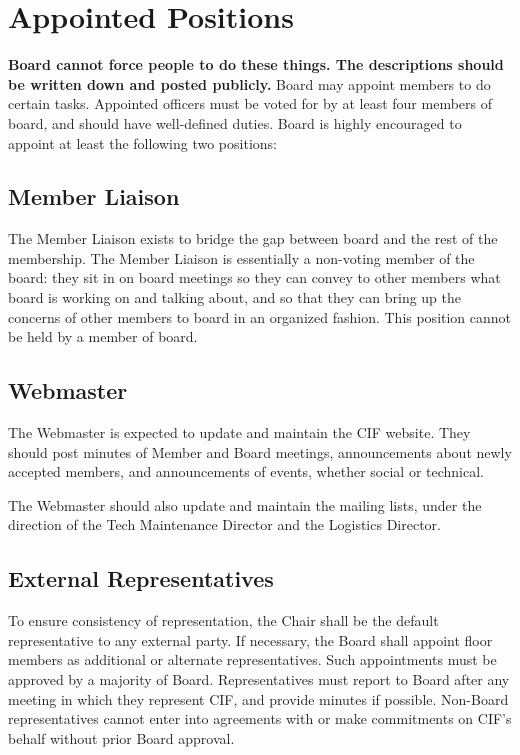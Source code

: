\section {Appointed Positions}
\label{sec:appointed-positions}

\textbf{Board cannot force people to do these things. The descriptions should be written down and posted publicly.}
Board may appoint members to do certain tasks. Appointed officers must be voted for by at least four members of board, and should have well-defined duties. Board is highly encouraged to appoint at least the following two positions:



	\subsection{Member Liaison}

	The Member Liaison exists to bridge the gap between board and the rest of the membership. The Member Liaison is essentially a non-voting member of the board: they sit in on board meetings so they can convey to other members what board is working on and talking about, and so that they can bring up the concerns of other members to board in an organized fashion. This position cannot be held by a member of board.



	\subsection{Webmaster}

	The Webmaster is expected to update and maintain the CIF website. They should post minutes of Member and Board meetings, announcements about newly accepted members, and announcements of events, whether social or technical.
	
	The Webmaster should also update and maintain the mailing lists, under the direction of the Tech Maintenance Director and the Logistics Director.



	\subsection{External Representatives}

	To ensure consistency of representation, the Chair shall be the default representative to any external party. If necessary, the Board shall appoint floor members as additional or alternate representatives. Such appointments must be approved by a majority of Board. Representatives must report to Board after any meeting in which they represent CIF, and provide minutes if possible. Non-Board representatives cannot enter into agreements with or make commitments on CIF's behalf without prior Board approval.
